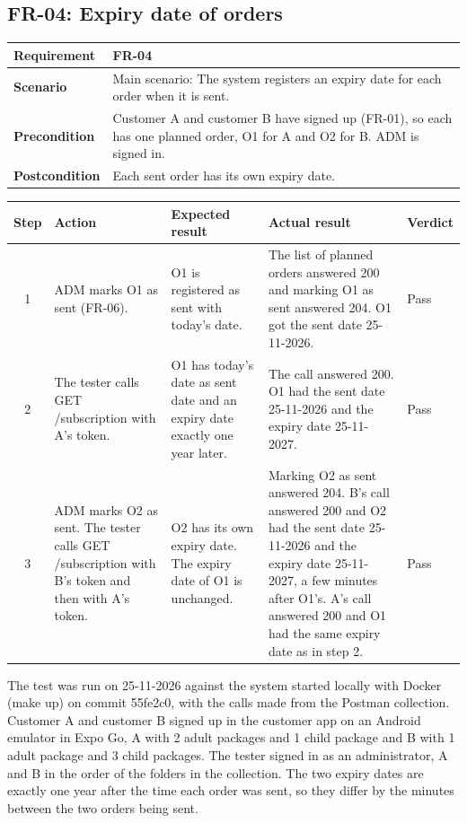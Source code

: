 \documentclass[a4paper,11pt]{article}
\newcommand{\scenarioinfo}[4]{%
  \noindent\begin{tabular}{|p{3cm}|p{12cm}|}
  \hline
  \textbf{Requirement} & \textbf{#1} \\
  \hline
  \textbf{Scenario} & #2 \\
  \hline
  \textbf{Precondition} & #3 \\
  \hline
  \textbf{Postcondition} & #4 \\
  \hline
  \end{tabular}\par\medskip}
\newenvironment{steps}{%
  \noindent\footnotesize
  \begin{tabular}{|c|p{3.6cm}|p{4.6cm}|p{3.2cm}|p{1.5cm}|}
  \hline
  \textbf{Step} & \textbf{Action} & \textbf{Expected result} & \textbf{Actual result} & \textbf{Verdict} \\
  \hline
}{%
  \end{tabular}\par\bigskip
}
\begin{document}
\subsection{FR-04: Expiry date of orders}
\scenarioinfo{FR-04}
  {Main scenario: The system registers an expiry date for each order when it is sent.}
  {Customer A and customer B have signed up (FR-01), so each has one planned order, O1 for A and O2 for B. ADM is signed in.}
  {Each sent order has its own expiry date.}
\begin{steps}
1 & ADM marks O1 as sent (FR-06). & O1 is registered as sent with today's date. & The list of planned orders answered 200 and marking O1 as sent answered 204. O1 got the sent date 25-11-2026. & Pass \\
\hline
2 & The tester calls GET /subscription with A's token. & O1 has today's date as sent date and an expiry date exactly one year later. & The call answered 200. O1 had the sent date 25-11-2026 and the expiry date 25-11-2027. & Pass \\
\hline
3 & ADM marks O2 as sent. The tester calls GET /subscription with B's token and then with A's token. & O2 has its own expiry date. The expiry date of O1 is unchanged. & Marking O2 as sent answered 204. B's call answered 200 and O2 had the sent date 25-11-2026 and the expiry date 25-11-2027, a few minutes after O1's. A's call answered 200 and O1 had the same expiry date as in step 2. & Pass \\
\hline
\end{steps}

The test was run on 25-11-2026 against the system started locally with Docker (make up) on commit 55fe2c0, with the calls made from the Postman collection. Customer A and customer B signed up in the customer app on an Android emulator in Expo Go, A with 2 adult packages and 1 child package and B with 1 adult package and 3 child packages. The tester signed in as an administrator, A and B in the order of the folders in the collection. The two expiry dates are exactly one year after the time each order was sent, so they differ by the minutes between the two orders being sent.
\end{document}
